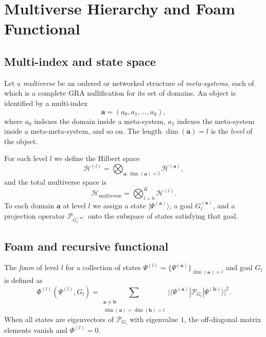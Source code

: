 \documentclass[12pt,a4paper]{article}
\newcommand{\pG}{\mathcal{P}_{G}}
\newcommand{\HH}{\mathcal{H}}
\begin{document}
\section{Multiverse Hierarchy and Foam Functional}

\subsection{Multi-index and state space}
Let a \emph{multiverse} be an ordered or networked structure of \emph{meta-systems}, each of which is a complete GRA nullification for its set of domains. An object is identified by a multi-index
\begin{equation}
\mathbf{a} = (a_0, a_1, \dots, a_k),
\end{equation}
where $a_0$ indexes the domain inside a meta-system, $a_1$ indexes the meta-system inside a meta-meta-system, and so on. The length $\dim(\mathbf{a})=l$ is the \emph{level} of the object.

For each level $l$ we define the Hilbert space
\begin{equation}
\HH^{(l)} = \bigotimes_{\mathbf{a}: \dim(\mathbf{a}) = l} \HH^{(\mathbf{a})},
\end{equation}
and the total multiverse space is
\begin{equation}
\HH_{\text{multiverse}} = \bigotimes_{l=0}^{K} \HH^{(l)}.
\end{equation}
To each domain $\mathbf{a}$ at level $l$ we assign a state $|\Psi^{(\mathbf{a})}\rangle$, a goal $G_l^{(\mathbf{a})}$, and a projection operator $\pG_l^{(\mathbf{a})}$ onto the subspace of states satisfying that goal.

\subsection{Foam and recursive functional}
The \emph{foam} of level $l$ for a collection of states $\Psi^{(l)} = \{\Psi^{(\mathbf{a})}\}_{\dim(\mathbf{a})=l}$ and goal $G_l$ is defined as
\begin{equation}\label{eq:foam}
\Phi^{(l)}(\Psi^{(l)}, G_l) = \sum_{\substack{\mathbf{a}\neq\mathbf{b}\\ \dim(\mathbf{a})=\dim(\mathbf{b})=l}} 
\bigl| \langle \Psi^{(\mathbf{a})} | \pG_l | \Psi^{(\mathbf{b})} \rangle \bigr|^2.
\end{equation}
When all states are eigenvectors of $\pG_l$ with eigenvalue $1$, the off-diagonal matrix elements vanish and $\Phi^{(l)}=0$.
\end{document}
